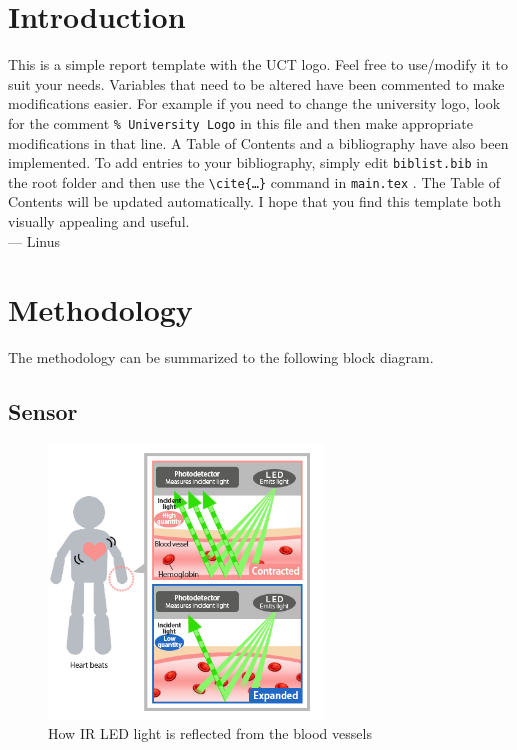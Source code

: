\documentclass[12pt]{article}
\begin{document}
\section{Introduction}
This is a simple report template with the UCT logo. Feel free to use/modify it to suit your needs. Variables that need to be altered have been commented to make modifications easier. For example if you need to change the university logo, look for the comment \texttt{\% University Logo} in this file and then make appropriate modifications in that line.
A Table of Contents and a bibliography have also been implemented. To add entries to your bibliography, simply edit \texttt{biblist.bib} in the root folder and then use the \texttt{\textbackslash cite\{\ldots\}} command in \texttt{main.tex} \cite{ppg_wiki}. The Table of Contents will be updated automatically.
I hope that you find this template both visually appealing and useful. \\
\hspace{1 cm}--- Linus









\newpage
\section{Methodology}

	The methodology can be summarized to the following block diagram.


	\subsection{Sensor}
	\lipsum[5]
	\begin{figure}[!htbp]  %

		\centering
		\includegraphics[width=0.65\textwidth]{sensing.jpg}
		\caption{How IR LED light is reflected from the blood vessels}
	\end{figure}
\end{document}
